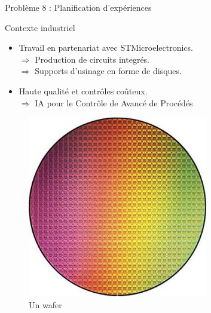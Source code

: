 \documentclass[10pt]{beamer}
\begin{document}
\begin{frame}{Problème 8 : Planification d'expériences}
\begin{minipage}{0.72\textwidth}
\begin{block}{Contexte industriel}
\small {\begin{itemize}
\item Travail en partenariat avec STMicroelectronics. \\ 
      $\Rightarrow$ Production de circuits integrés. \\
      $\Rightarrow$ Supports d'usinage en forme de disques.
\item Haute qualité et contrôles coûteux. \\
      $\Rightarrow$ IA pour le Contrôle de Avancé de Procédés
\end{itemize}}
\end{block}
\end{minipage}
\begin{minipage}{0.25\textwidth}
\vspace{0.1\textwidth}
\begin{figure} [H] 
 \centering
\includegraphics[width=0.7\textwidth, height=0.7\textwidth]{figures/wafer}
\caption*{Un wafer}
\end{figure}
\end{minipage}
\end{frame}
 
\end{document}
